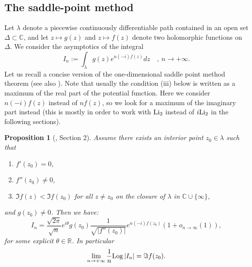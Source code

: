 \documentclass[11pt]{amsart}
\newtheorem{prop}[teo]{Proposition}
\newcommand{\Log}{{\rm Log}}
\newcommand{\ra}{\rightarrow}
\begin{document}
{\subsection{The saddle-point method}\label{sub:SPM:PV} Let $\lambda$ denote a piecewise continuously differentiable path contained in an open
set $\Delta \subset \mathbb{C}$, and let $z \mapsto g(z)$ and $z \mapsto f(z)$ denote two holomorphic functions on $\Delta$.
We consider the asymptotics of the integral
\begin{equation}\label{intIndec25}
I_n := \int_{\lambda} g(z) e^{n (-i) f(z)} dz\quad , \ n\to +\infty.
\end{equation}
Let us recall a concise version of the one-dimensional saddle point method theorem (see also \cite{O'Sul}). Note that usually the condition (iii) below is written as a maximum of the real part of the potential function. Here we consider $n(-i)f(z)$ instead of $nf(z)$, so we look for a maximum of the imaginary part instead (this is mostly in order to work with ${\rm Li}_2$ instead of $i{\rm Li}_2$ in the following sections).

\begin{prop}[\cite{PV}, Section 2]\label{prop:SPM:PV} Assume there exists an interior point $z_0 \in \lambda$ such that 
	\begin{enumerate}[label=(\roman*)]
\item $f'(z_0)=0$,
\item $f''(z_0) \neq 0$,
\item $\Im f(z) < \Im f(z_0)$ for all $z \neq z_0$ on the closure of $\lambda$ in $\mathbb{C}\cup\{\infty\}$,
	\end{enumerate}
and $g(z_0)\neq 0$. Then we have:
$$ I_n = \dfrac{\sqrt{2\pi}}{\sqrt{n}} e^{i \theta} g(z_0) \dfrac{1}{\sqrt{|f''(z_0)|}}
e^{n (-i) f(z_0)} \left ( 1+ o_{n \to \infty}(1) \right ),
$$
for some explicit $\theta \in \mathbb{R}$. In particular 
$$ \lim_{n\ra +\infty}  \dfrac{1}{n}\Log \left \vert I_n \right \vert = \Im f(z_0).
$$
\end{prop}

}
\end{document}
